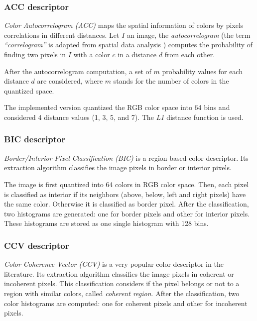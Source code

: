 \subsubsection{ACC descriptor}

\emph{Color Autocorrelogram (ACC) }\cite{huang1997image} maps the spatial information of colors by pixels correlations in different distances. Let $I$ an image, the \emph{autocorrelogram} (the term \emph{“correlogram”} is adapted from spatial data analysis \cite{upton1985spatial}) computes the probability of finding two pixels in $I$ with a color $c$ in a distance $d$ from each other. 

After the autocorrelogram computation, a set of $m$ probability values for each distance $d$ are considered, where $m$ stands for the number of colors in the quantized space. 

The implemented version quantized the RGB color space into 64 bins and considered 4 distance values (1, 3, 5, and 7). The \emph{L1} distance function is used.

\subsubsection{BIC descriptor}

\emph{Border/Interior Pixel Classification (BIC)} \cite{stehling2002compact} is a region-based color descriptor. Its extraction algorithm classifies the image pixels in border or interior
pixels. 

The image is first quantized into 64 colors in RGB color space. Then, each pixel is classified as interior
if its neighbors (above, below, left and right pixels) have the same color. Otherwise it is classified as border pixel. After the classification, two histograms are generated: one for border pixels and other for interior pixels. These histograms are stored as one single histogram with 128 bins.

\subsubsection{CCV descriptor}

\emph{Color Coherence Vector (CCV)} \cite{pass1997comparing} is a very popular color descriptor in the literature. Its extraction algorithm classifies the image pixels in coherent or incoherent pixels. This classification considers if the pixel belongs or not to a region with similar colors, called \emph{coherent region}. After the classification, two color histograms are computed: one for coherent pixels and other for incoherent pixels.


